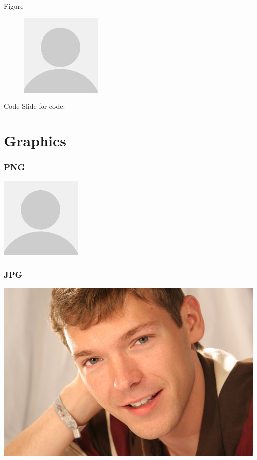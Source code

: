 \documentclass{Beamer}
\begin{document}
\begin{frame}{Figure}
  \begin{figure}
    \includegraphics{avatar}
  \end{figure}
\end{frame}

\begin{frame}[fragile]{Code}
  Slide for code.
\end{frame}

\section{Graphics}

\begin{frame}
  \frametitle{PNG}
  \begin{center}
    \includegraphics{avatar}
  \end{center}
\end{frame}

\begin{frame}
  \frametitle{JPG}
  \begin{center}
    \includegraphics{5075}
  \end{center}
\end{frame}
\end{document}
